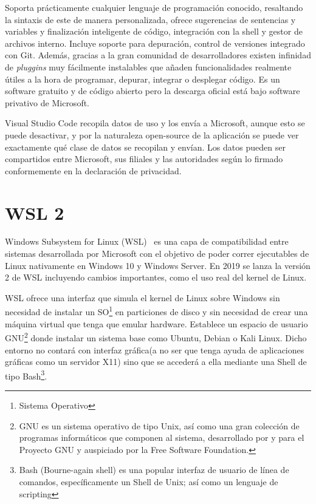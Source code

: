 \documentclass[a4paper, 12pt]{book}
\begin{document}
Soporta prácticamente cualquier lenguaje de programación conocido, resaltando la sintaxis de este de manera personalizada, ofrece sugerencias de sentencias y variables y finalización inteligente de código, integración con la shell y gestor de archivos interno. Incluye soporte para depuración, control de versiones integrado con Git. Además, gracias a la gran comunidad de desarrolladores existen infinidad de \emph{pluggins} muy fácilmente instalables que añaden funcionalidades realmente útiles a la hora de programar, depurar, integrar o desplegar código. 
Es un software gratuito y de código abierto pero la descarga oficial está bajo software privativo de Microsoft. 

Visual Studio Code recopila datos de uso y los envía a Microsoft, aunque esto se puede desactivar, y por la naturaleza open-source de la aplicación se puede ver exactamente qué clase de datos se recopilan y envían. Los datos pueden ser compartidos entre Microsoft, sus filiales y las autoridades según lo firmado conformemente en la declaración de privacidad. 

\section{WSL 2}
\label{sec:WSL}
Windows Subsystem for Linux (WSL)~\cite{wsl2} es una capa de compatibilidad entre sistemas desarrollada por Microsoft con el objetivo de poder correr ejecutables de Linux nativamente en Windows 10 y Windows Server. En 2019 se lanza la versión 2 de WSL incluyendo cambios importantes, como el uso real del kernel de Linux. 

WSL ofrece una interfaz que simula el kernel de Linux sobre Windows sin necesidad de instalar un SO\footnote{Sistema Operativo} en particiones de disco y sin necesidad de crear una máquina virtual que tenga que emular hardware. Establece un espacio de usuario GNU\footnote{GNU es un sistema operativo de tipo Unix, así como una gran colección de programas informáticos que componen al sistema, desarrollado por y para el Proyecto GNU y auspiciado por la Free Software Foundation.} donde instalar un sistema base como Ubuntu, Debian o Kali Linux. Dicho entorno no contará con interfaz gráfica(a no ser que tenga ayuda de aplicaciones gráficas como un servidor X11) sino que se accederá a ella mediante una Shell de tipo Bash\footnote{Bash (Bourne-again shell) es una popular interfaz de usuario de línea de comandos, específicamente un Shell de Unix; así como un lenguaje de scripting}. 
\end{document}
